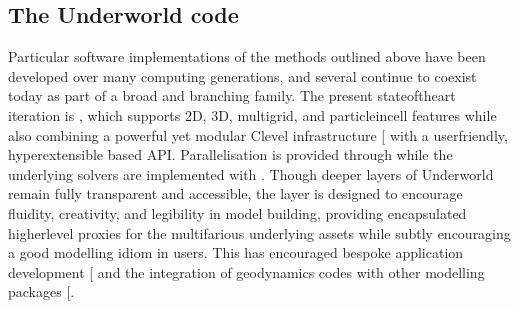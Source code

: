 \documentclass[letterpaper,10pt,english]{jupyterBook}
\begin{document}
\subsection{The Underworld code}
\label{\detokenize{content/chapter_02_methods/section2:the-underworld-code}}
\sphinxAtStartPar
Particular software implementations of the methods outlined above have been developed over many computing generations, and several continue to co\sphinxhyphen{}exist today as part of a broad and branching family. The present state\sphinxhyphen{}of\sphinxhyphen{}the\sphinxhyphen{}art iteration is , which supports 2D, 3D, multigrid, and particle\sphinxhyphen{}in\sphinxhyphen{}cell features while also combining a powerful yet modular C\sphinxhyphen{}level infrastructure {[}\sphinxcite{references:id70}{]} with a user\sphinxhyphen{}friendly, hyper\sphinxhyphen{}extensible \sphinxhyphen{}based API. Parallelisation is provided through  while the underlying solvers are implemented with . Though deeper layers of Underworld remain fully transparent and accessible, the  layer is designed to encourage fluidity, creativity, and legibility in model building, providing encapsulated higher\sphinxhyphen{}level proxies for the multifarious underlying  assets while subtly encouraging a good modelling idiom in users. This has encouraged bespoke application development {[}\sphinxcite{references:id71}{]} and the integration of geodynamics codes with other modelling packages {[}\sphinxcite{references:id66}{]}.
\end{document}
